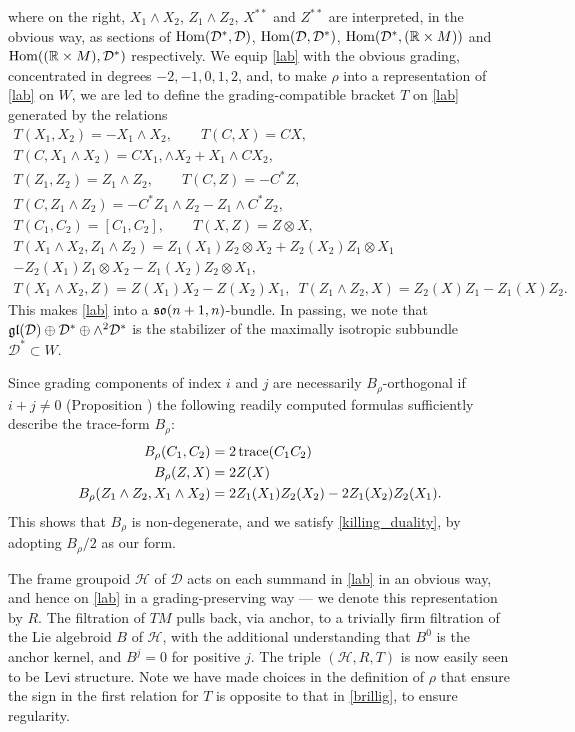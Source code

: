 \documentclass[leqno,12pt]{amsart} %
\begin{document}
where on the right, $X_1\wedge X_2$, $Z_1\wedge Z_2$, $X^{**}$ and $Z^{**}$ are
interpreted, in the obvious way, as sections of
$\operatorname{Hom}({\mathcal D}^*, {\mathcal D})$,
$\operatorname{Hom}({\mathcal D}, {\mathcal D}^*)$,
$\operatorname{Hom}({\mathcal D}^*, ({\mathbb R} \times M))$ and
$\operatorname{Hom}(({\mathbb R} \times M), {\mathcal D}^*)$ respectively.  We equip
\eqref{lab} with the obvious grading, concentrated in degrees $-2, -1, 0, 1, 2$, and, to
make $\rho $ into a representation of \eqref{lab} on $W$, we are led to define the
grading-compatible bracket $T$ on \eqref{lab} generated by the relations
\begin{gather*}
    T(X_1, X_2) = - X_1\wedge X_2, \qquad  T(C, X) = CX,\\
    T(C, X_1 \wedge X_2) = CX_1, \wedge X_2 + X_1 \wedge CX_2, \\
    T(Z_1, Z_2) = Z_1 \wedge Z_2, \qquad  T(C, Z) = -C^*Z,\\
    T(C, Z_1 \wedge Z_2) = -C^*Z_1 \wedge Z_2 - Z_1 \wedge C^*Z_2,\\
    T(C_1, C_2) = [C_1, C_2], \qquad T(X, Z) = Z \otimes X,\\
    T(X_1 \wedge X_2, Z_1 \wedge Z_2) = Z_1(X_1)Z_2 \otimes X_2 + Z_2(X_2)Z_1\otimes X_1\\ -Z_2(X_1)Z_1 \otimes X_2 - Z_1(X_2)Z_2 \otimes X_1,\\
    T(X_1 \wedge X_2, Z) = Z(X_1)X_2 - Z(X_2)X_1, \enspace
    T(Z_1 \wedge Z_2, X) = Z_2(X)Z_1 - Z_1(X)Z_2.
\end{gather*}
This makes \eqref{lab} into a $\mathfrak{so}(n + 1, n)$-bundle. In passing, we note that
$\mathfrak{gl}({\mathcal D}) \oplus {\mathcal D}^* \oplus \wedge^2 {\mathcal D}^*$ is the stabilizer
of the maximally isotropic subbundle ${\mathcal D}^* \subset W$.

Since grading components of index $i$ and $j$ are necessarily $B_\rho$-orthogonal if
$i + j \ne 0$ (Proposition ) the following readily computed formulas
sufficiently describe the trace-form $B_\rho $:
\begin{align*}
    B_\rho(C_1, C_2) &= 2\operatorname{trace}(C_1C_2)\\
    B_\rho(Z, X) &= 2Z(X)\\
    B_\rho(Z_1 \wedge Z_2, X_1\wedge X_2) &= 2Z_1(X_1)Z_2(X_2) - 2Z_1(X_2)Z_2(X_1).
\end{align*}
This shows that $B_\rho$ is non-degenerate, and we satisfy \eqref{killing_duality}, by
adopting $B_\rho/2$ as our form.

The frame groupoid ${\mathcal H} $ of ${\mathcal D} $ acts on each summand in \eqref{lab}
in an obvious way, and hence on \eqref{lab} in a grading-preserving way --- we denote this
representation by $R$. The filtration of $TM$ pulls back, via anchor, to a trivially firm
filtration of the Lie algebroid $B$ of ${\mathcal H} $, with the additional understanding
that $B^0$ is the anchor kernel, and $B^j=0 $ for positive $j$. The triple
$({\mathcal H}, R, T)$ is now easily seen to be Levi structure. Note we have made choices
in the definition of $\rho$ that ensure the sign in the first relation for $T$ is opposite
to that in \eqref{brillig}, to ensure regularity.
\end{document}
